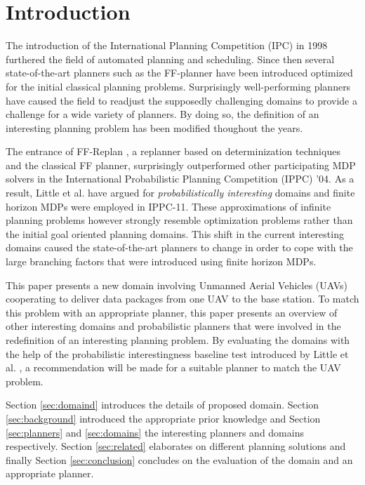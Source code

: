 \documentclass[runningheads,a4paper]{llncs}
\begin{document}

\section{Introduction}
The introduction of the International Planning Competition (IPC) in 1998 furthered the field of automated planning and scheduling. Since then several state-of-the-art planners such as the FF-planner \cite{Hoffmann01theff} have been introduced optimized for the initial classical planning problems. Surprisingly well-performing planners have caused the field to readjust the supposedly challenging domains to provide a challenge for a wide variety of planners. By doing so, the definition of an interesting planning problem has been modified thoughout the years.

The entrance of FF-Replan \cite{FFReplan}, a replanner based on determinization techniques and the classical FF planner, surprisingly outperformed other participating MDP solvers in the International Probabilistic Planning Competition (IPPC) '04. As a result, Little et al. have argued for \emph{probabilistically interesting} domains \cite{little2007probvsreplan} and finite horizon MDPs were employed in IPPC-11. These approximations of infinite planning problems however strongly resemble optimization problems rather than the initial goal oriented planning domains. This shift in the current interesting domains caused the state-of-the-art planners to change in order to cope with the large branching factors that were introduced using finite horizon MDPs.

This paper presents a new domain involving Unmanned Aerial Vehicles (UAVs) cooperating to deliver data packages from one UAV to the base station. To match this problem with an appropriate planner, this paper presents an overview of other interesting domains and probabilistic planners that were involved in the redefinition of an interesting planning problem. By evaluating the domains with the help of the probabilistic interestingness baseline test introduced by Little et al. \cite{little2007probvsreplan}, a recommendation will be made for a suitable planner to match the UAV problem.

Section \ref{sec:domaind} introduces the details of proposed domain. Section \ref{sec:background} introduced the appropriate prior knowledge and Section \ref{sec:planners} and  \ref{sec:domains} the interesting planners and domains respectively. Section \ref{sec:related} elaborates on different planning solutions and finally Section \ref{sec:conclusion} concludes on the evaluation of the domain and an appropriate planner.
\end{document}
